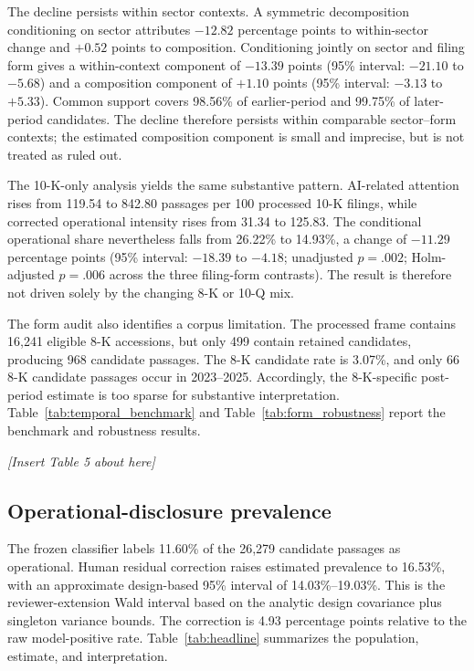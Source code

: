 \documentclass[12pt]{article}
\newcommand{\placement}[1]{%
  \begin{center}
    \vspace{0.5\baselineskip}
    \textit{[Insert #1 about here]}
    \vspace{0.5\baselineskip}
  \end{center}
}
\begin{document}
The decline persists within sector contexts. A symmetric decomposition
conditioning on sector attributes
$-12.82$ percentage points to within-sector change and $+0.52$ points to
composition. Conditioning jointly on sector and filing form gives a
within-context component of $-13.39$ points (95\% interval:
$-21.10$ to $-5.68$) and a composition component of $+1.10$ points
(95\% interval: $-3.13$ to $+5.33$). Common support covers 98.56\% of
earlier-period and 99.75\% of later-period candidates. The decline therefore
persists within comparable sector--form contexts; the estimated composition
component is small and imprecise, but is not treated as ruled out.

The 10-K-only analysis yields the same substantive pattern. AI-related
attention rises from 119.54 to 842.80 passages per 100 processed 10-K filings,
while corrected operational intensity rises from 31.34 to 125.83. The
conditional operational share nevertheless falls from 26.22\% to 14.93\%, a
change of $-11.29$ percentage points (95\% interval:
$-18.39$ to $-4.18$; unadjusted $p=.002$; Holm-adjusted $p=.006$ across the
three filing-form contrasts). The result is therefore not driven solely by
the changing 8-K or 10-Q mix.

The form audit also identifies a corpus limitation. The processed frame
contains 16,241 eligible 8-K accessions, but only 499 contain retained
candidates, producing 968 candidate passages. The 8-K candidate rate is
3.07\%, and only 66 8-K candidate passages occur in 2023--2025. Accordingly,
the 8-K-specific post-period estimate is too sparse for substantive
interpretation. Table~\ref{tab:temporal_benchmark} and
Table~\ref{tab:form_robustness} report the benchmark and robustness results.

\placement{Table 5}

\subsection{Operational-disclosure prevalence}

The frozen classifier labels 11.60\% of the 26,279 candidate passages as
operational. Human residual correction raises estimated prevalence to
16.53\%, with an approximate design-based 95\% interval of
14.03\%--19.03\%. This is the reviewer-extension Wald interval based on the
analytic design covariance plus singleton variance bounds. The correction is
4.93 percentage points relative to the
raw model-positive rate. Table~\ref{tab:headline} summarizes the population,
estimate, and interpretation.
\end{document}
